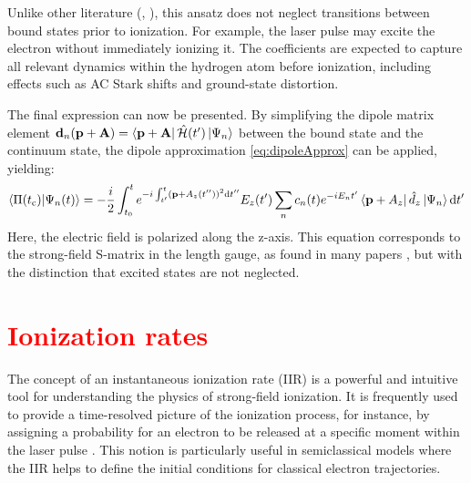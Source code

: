 Unlike other literature (\cite{Theory_NPS}, \cite{Ivanov20012005}), this ansatz does not neglect transitions between bound states prior to ionization.
For example, the laser pulse may excite the electron without immediately ionizing it.
The coefficients are expected to capture all relevant dynamics within the hydrogen atom before ionization, including effects such as AC Stark shifts and ground-state distortion.

The final expression can now be presented.
By simplifying the dipole matrix element $\mathbf{d}_n(\mathbf{p}+\mathbf{A}) = \bra{\mathbf{p}+\mathbf{A}}\hat{\mathcal{H}}(t')\ket{\Psi_n}$ between the bound state and the continuum state, the dipole approximation \eqref{eq:dipoleApprox} can be applied, yielding:
\begin{equation*}
    \braket{\Pi(t_{\mathrm{c}})|\Psi_n(t)} = -\frac{i}{2}\int_{t_0}^{t} e^{-i \int_{t'}^{t} (\mathbf{p} + A_z(t''))^2 \mathrm{d} t''}E_z(t')\sum_{n}c_n(t)e^{-iE_nt'}\bra{\mathbf{p}+A_z}\hat{d}_z\ket{\Psi_n} \mathrm{d} t'       \label{eq:smatrix}
\end{equation*}
Here, the electric field is polarized along the z-axis.
This equation corresponds to the strong-field S-matrix in the length gauge, as found in many papers \cite{Theory_NPS}, but with the distinction that excited states are not neglected.




\section{\textcolor{red}{Ionization rates}}



The concept of an instantaneous ionization rate (IIR) is a powerful and intuitive tool for understanding the physics of strong-field ionization. 
It is frequently used to provide a time-resolved picture of the ionization process, for instance, by assigning a probability for an electron to be released at a specific moment within the laser pulse \cite{Ivanov2018}. 
This notion is particularly useful in semiclassical models where the IIR helps to define the initial conditions for classical electron trajectories.


